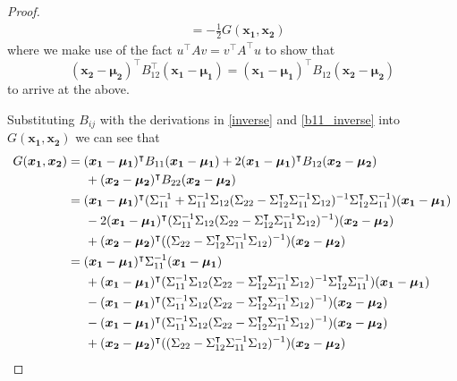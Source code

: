 \documentclass[12pt]{article}
\theoremstyle{definition}
\newcommand{\vect}[1]{\boldsymbol{#1}}
\begin{document}
\begin{proof}
\begin{align}
     &= -\frac{1}{2} G(\vect{x_1}, \vect{x_2})
   \end{align}
   where we make use of the fact $u^\intercal A v = v ^\intercal A^\intercal u$
   to show that
   \[
     (\vect{x_2} - \vect{\mu_2})^\intercal B_{12}^\intercal (\vect{x_1} - \vect{\mu_1}) = (\vect{x_1} - \vect{\mu_1})^\intercal B_{12} (\vect{x_2} - \vect{\mu_2})
   \]
   to arrive at the above.

   Substituting $B_{ij}$ with the derivations in \eqref{inverse} and
   \eqref{b11_inverse} into $G(\vect{x_1}, \vect{x_2})$ we can see that
   \begin{align}\label{exp_eval}
     G(\vect{x_1}, \vect{x_2})
     &= (\vect{x_1} - \vect{\mu_1})^\intercal B_{11} (\vect{x_1} - \vect{\mu_1}) + 2(\vect{x_1} - \vect{\mu_1})^\intercal B_{12} (\vect{x_2} - \vect{\mu_2}) \notag \\  & \hspace{5mm} + (\vect{x_2} - \vect{\mu_2})^\intercal B_{22} (\vect{x_2} - \vect{\mu_2}) \notag \\
     &= (\vect{x_1} - \vect{\mu_1})^\intercal (\Sigma_{11}^{-1} + \Sigma_{11}^{-1} \Sigma_{12} (\Sigma_{22} - \Sigma_{12}^\intercal\Sigma_{11}^{-1}\Sigma_{12})^{-1} \Sigma_{12}^\intercal \Sigma_{11}^{-1}) (\vect{x_1} - \vect{\mu_1}) \notag \\ & \hspace{5mm} - 2(\vect{x_1} - \vect{\mu_1})^\intercal (\Sigma_{11}^{-1}\Sigma_{12}(\Sigma_{22} - \Sigma_{12}^\intercal\Sigma_{11}^{-1}\Sigma_{12})^{-1}) (\vect{x_2} - \vect{\mu_2}) \notag \\  & \hspace{5mm} + (\vect{x_2} - \vect{\mu_2})^\intercal ((\Sigma_{22} - \Sigma_{12}^\intercal\Sigma_{11}^{-1}\Sigma_{12})^{-1}) (\vect{x_2} - \vect{\mu_2}) \notag \\
     &= (\vect{x_1} - \vect{\mu_1})^\intercal \Sigma_{11}^{-1} (\vect{x_1} - \vect{\mu_1}) \notag \\ & \hspace{5mm} + (\vect{x_1} - \vect{\mu_1})^\intercal (\Sigma_{11}^{-1} \Sigma_{12} (\Sigma_{22} - \Sigma_{12}^\intercal\Sigma_{11}^{-1}\Sigma_{12})^{-1} \Sigma_{12}^\intercal \Sigma_{11}^{-1}) (\vect{x_1} - \vect{\mu_1}) \notag \\ & \hspace{5mm} - (\vect{x_1} - \vect{\mu_1})^\intercal (\Sigma_{11}^{-1}\Sigma_{12}(\Sigma_{22} - \Sigma_{12}^\intercal\Sigma_{11}^{-1}\Sigma_{12})^{-1}) (\vect{x_2} - \vect{\mu_2}) \notag \\  & \hspace{5mm} - (\vect{x_1} - \vect{\mu_1})^\intercal (\Sigma_{11}^{-1}\Sigma_{12}(\Sigma_{22} - \Sigma_{12}^\intercal\Sigma_{11}^{-1}\Sigma_{12})^{-1}) (\vect{x_2} - \vect{\mu_2}) \notag \\  & \hspace{5mm} + (\vect{x_2} - \vect{\mu_2})^\intercal ((\Sigma_{22} - \Sigma_{12}^\intercal\Sigma_{11}^{-1}\Sigma_{12})^{-1}) (\vect{x_2} - \vect{\mu_2}) \notag \\

\end{align}
\end{proof}
\end{document}
